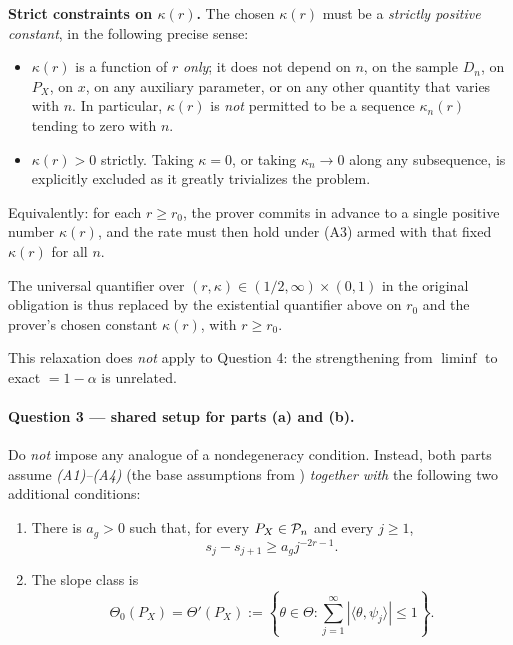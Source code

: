 \documentclass{article}
\begin{document}
\textbf{Strict constraints on \(\kappa(r)\).} The chosen \(\kappa(r)\)
must be a \emph{strictly positive constant}, in the following precise
sense:
\begin{itemize}
  \item \(\kappa(r)\) is a function of \(r\) \emph{only}; it does not
    depend on \(n\), on the sample \(D_n\), on \(P_X\), on \(x\), on
    any auxiliary parameter, or on any other quantity that varies with
    \(n\). In particular, \(\kappa(r)\) is \emph{not} permitted to be a
    sequence \(\kappa_n(r)\) tending to zero with \(n\).
  \item \(\kappa(r)>0\) strictly. Taking \(\kappa=0\), or taking
    \(\kappa_n\to 0\) along any subsequence, is explicitly excluded as
    it greatly trivializes the problem.
\end{itemize}
Equivalently: for each \(r\geq r_0\), the prover commits in advance to
a single positive number \(\kappa(r)\), and the rate must then hold
under (A3) armed with that fixed \(\kappa(r)\) for all \(n\).

The universal quantifier over
\((r,\kappa)\in(1/2,\infty)\times(0,1)\) in the original obligation is
thus replaced by the existential quantifier above on \(r_0\) and the
prover's chosen constant \(\kappa(r)\), with \(r\geq r_0\).

This relaxation does \emph{not} apply to Question 4: the strengthening
from \(\liminf\) to exact \(=1-\alpha\) is unrelated.

\paragraph{Question 3 --- shared setup for parts (a) and (b).}
Do \emph{not} impose any analogue of a nondegeneracy condition.
Instead, both parts assume \emph{(A1)--(A4)} (the base assumptions from
) \emph{together with} the following two additional
conditions:

\begin{enumerate}
  \item[(C1)] There is \(a_g>0\) such that, for every \(P_X\in\mathcal P_n\) and
  every \(j\ge 1\),
  \[
    s_j-s_{j+1}\ge a_g j^{-2r-1}.
  \]

  \item[(C2)] The slope class is
  \[
    \Theta_0(P_X)=\Theta'(P_X)
    :=
    \left\{
      \theta\in\Theta:
      \sum_{j=1}^{\infty}|\langle\theta,\psi_j\rangle|\le 1
    \right\}.
  \]
\end{enumerate}
\end{document}
